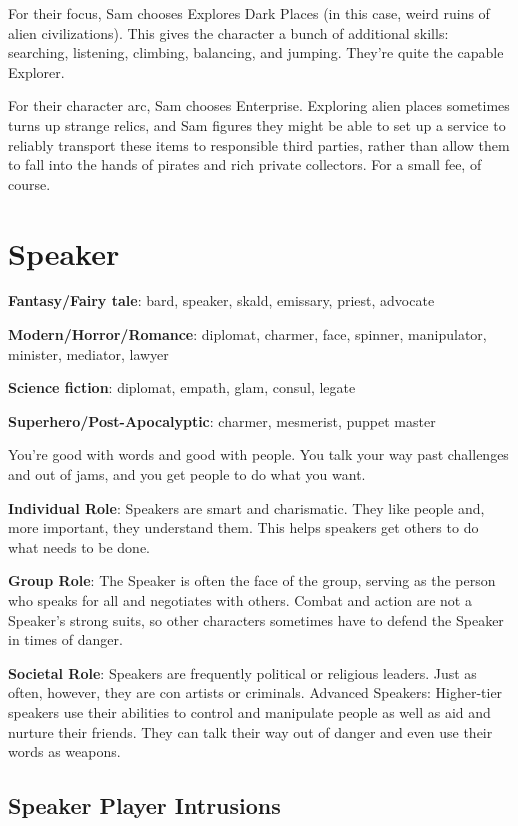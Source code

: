 For their focus, Sam chooses Explores Dark Places (in this case, weird ruins of alien civilizations). This gives the character a bunch of additional skills: searching, listening, climbing, balancing, and jumping. They’re quite the capable Explorer.

For their character arc, Sam chooses Enterprise. Exploring alien places sometimes turns up strange relics, and Sam figures they might be able to set up a service to reliably transport these items to responsible third parties, rather than allow them to fall into the hands of pirates and rich private collectors. For a small fee, of course.

\section{Speaker}

\textbf{Fantasy/Fairy tale}: bard, speaker, skald, emissary, priest, advocate

\textbf{Modern/Horror/Romance}: diplomat, charmer, face, spinner, manipulator, minister, mediator, lawyer

\textbf{Science fiction}: diplomat, empath, glam, consul, legate

\textbf{Superhero/Post-Apocalyptic}: charmer, mesmerist, puppet master

You’re good with words and good with people. You talk your way past challenges and out of jams, and you get people to do what you want.

\textbf{Individual Role}: Speakers are smart and charismatic. They like people and, more important, they understand them. This helps speakers get others to do what needs to be done. 

\textbf{Group Role}: The Speaker is often the face of the group, serving as the person who speaks for all and negotiates with others. Combat and action are not a Speaker’s strong suits, so other characters sometimes have to defend the Speaker in times of danger.

\textbf{Societal Role}: Speakers are frequently political or religious leaders. Just as often, however, they are con artists or criminals. 
Advanced Speakers: Higher-tier speakers use their abilities to control and manipulate people as well as aid and nurture their friends. They can talk their way out of danger and even use their words as weapons.

\subsection{Speaker Player Intrusions}

